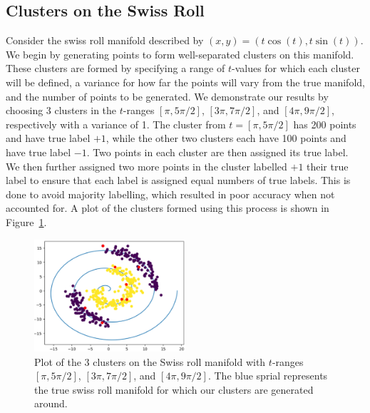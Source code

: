 \documentclass[12pt]{amsart}
\begin{document}
\subsection{Clusters on the Swiss Roll}

Consider the swiss roll manifold described by $(x,y) = (t\cos(t), t\sin(t))$. We begin by generating points to form well-separated clusters on this manifold. These clusters are formed by specifying a range of $t$-values for which each cluster will be defined, a variance for how far the points will vary from the true manifold, and the number of points to be generated. We demonstrate our results by choosing 3 clusters in the $t$-ranges $[\pi,5\pi/2]$, $[3\pi,7\pi/2]$, and $[4\pi,9\pi/2]$, respectively with a variance of 1. The cluster from $t=[\pi,5\pi/2]$ has 200 points and have true label $+1$, while the other two clusters each have 100 points and have true label $-1$. Two points in each cluster are then assigned its true label. We then further assigned two more points in the cluster labelled $+1$ their true label to ensure that each label is assigned equal numbers of true labels. This is done to avoid majority labelling, which resulted in poor accuracy when not accounted for. A plot of the clusters formed using this process is shown in Figure~\ref{Fig:SpiOg}.
\begin{figure}
    \centering
    \includegraphics[width=0.5\textwidth]{Figures/SpiOg.png}
    \caption{
        Plot of the 3 clusters on the Swiss roll manifold with $t$-ranges $[\pi,5\pi/2]$, $[3\pi,7\pi/2]$, and $[4\pi,9\pi/2]$. The blue sprial represents the true swiss roll manifold for which our clusters are generated around.
    }
	\label{Fig:SpiOg}
\end{figure}
\end{document}
